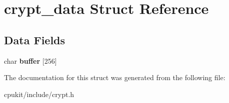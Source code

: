 \hypertarget{structcrypt__data}{}\section{crypt\+\_\+data Struct Reference}
\label{structcrypt__data}
\subsection*{Data Fields}
\begin{DoxyCompactItemize}
\item 
\mbox{\label{structcrypt__data_a1910c1d96fadb21156302a527b634950}} 
char {\bfseries buffer} \mbox{[}256\mbox{]}
\end{DoxyCompactItemize}


The documentation for this struct was generated from the following file\+:\begin{DoxyCompactItemize}
\item 
cpukit/include/crypt.\+h\end{DoxyCompactItemize}
